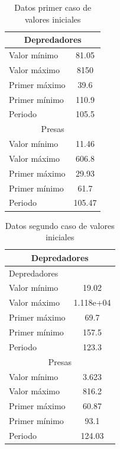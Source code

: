 \documentclass[12pt,letterpaper]{article}
\begin{document}
\begin{table}
\caption{Datos primer caso de valores iniciales}
\label{table:ejercicio31}
\centering
\begin{tabular}{| l | c |}
  \hline
 \multicolumn{2}{|c|}{Depredadores} \\
 \hline
 Valor mínimo &81.05 \\
 Valor máximo &8150\\
 Primer máximo&39.6\\
 Primer mínimo&110.9\\
 Periodo      &105.5\\
 \hline
 \multicolumn{2}{|c|}{Presas} \\
 \hline
 Valor mínimo &11.46\\
 Valor máximo &606.8\\
 Primer máximo&29.93\\
 Primer mínimo&61.7\\
 Periodo      &105.47\\
 \hline
\end{tabular}
\end{table}


\begin{table}
\caption{Datos segundo caso de valores iniciales}
\label{table:ejercicio32}
\centering
\begin{tabular}{| l| c| }
\hline
  \multicolumn{2}{|c|}{Depredadores} \\
\hline
  Depredadores & \\
  Valor mínimo &19.02\\
  Valor máximo &1.118e+04\\
  Primer máximo&69.7\\
  Primer mínimo&157.5\\
  Periodo      &123.3\\
\hline
  \multicolumn{2}{|c|}{Presas} \\
\hline
  Valor mínimo &3.623\\
  Valor máximo &816.2\\
  Primer máximo&60.87\\
  Primer mínimo&93.1\\
  Periodo      &124.03\\
\hline 
\end{tabular}
\end{table}
\end{document}

